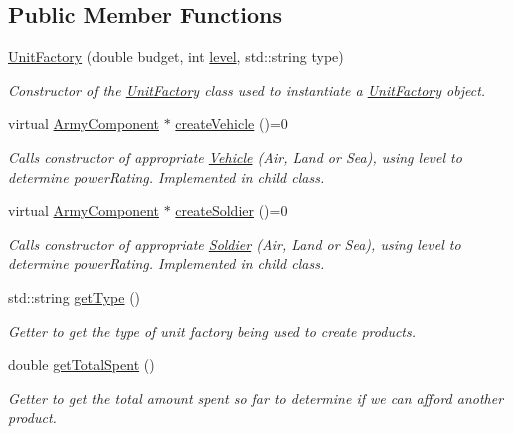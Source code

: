 \subsection*{Public Member Functions}
\begin{DoxyCompactItemize}
\item 
\mbox{\hyperlink{class_unit_factory_a7ea35d172bba07f7242b9ee1a5dd2c85}{Unit\+Factory}} (double budget, int \mbox{\hyperlink{class_unit_factory_ac8b73a1ed9adc43991450eb9aed0d40a}{level}}, std\+::string type)
\begin{DoxyCompactList}\small\item\em Constructor of the \mbox{\hyperlink{class_unit_factory}{Unit\+Factory}} class used to instantiate a \mbox{\hyperlink{class_unit_factory}{Unit\+Factory}} object. \end{DoxyCompactList}\item 
virtual \mbox{\hyperlink{class_army_component}{Army\+Component}} $\ast$ \mbox{\hyperlink{class_unit_factory_a465dd9ec1883939eb27274164e967822}{create\+Vehicle}} ()=0
\begin{DoxyCompactList}\small\item\em Calls constructor of appropriate \mbox{\hyperlink{class_vehicle}{Vehicle}} (Air, Land or Sea), using level to determine power\+Rating. Implemented in child class. \end{DoxyCompactList}\item 
virtual \mbox{\hyperlink{class_army_component}{Army\+Component}} $\ast$ \mbox{\hyperlink{class_unit_factory_a6f6dda71c85c3f44e09353b63d7c8fb5}{create\+Soldier}} ()=0
\begin{DoxyCompactList}\small\item\em Calls constructor of appropriate \mbox{\hyperlink{class_soldier}{Soldier}} (Air, Land or Sea), using level to determine power\+Rating. Implemented in child class. \end{DoxyCompactList}\item 
std\+::string \mbox{\hyperlink{class_unit_factory_aa850ff53daee1055f5d677d93604ce92}{get\+Type}} ()
\begin{DoxyCompactList}\small\item\em Getter to get the type of unit factory being used to create products. \end{DoxyCompactList}\item 
double \mbox{\hyperlink{class_unit_factory_a1b125d48cad0a2da1a98089d7eed1d50}{get\+Total\+Spent}} ()
\begin{DoxyCompactList}\small\item\em Getter to get the total amount spent so far to determine if we can afford another product. \end{DoxyCompactList}\item 

\end{DoxyCompactItemize}
